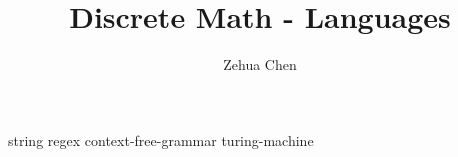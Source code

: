 \documentclass[letterpaper, 12pt]{report}
\title{Discrete Math - Languages}
\author{Zehua Chen}
\begin{document}
  \maketitle
  \tableofcontents

  {string}
  {regex}
  {context-free-grammar}
  {turing-machine}
\end{document}
